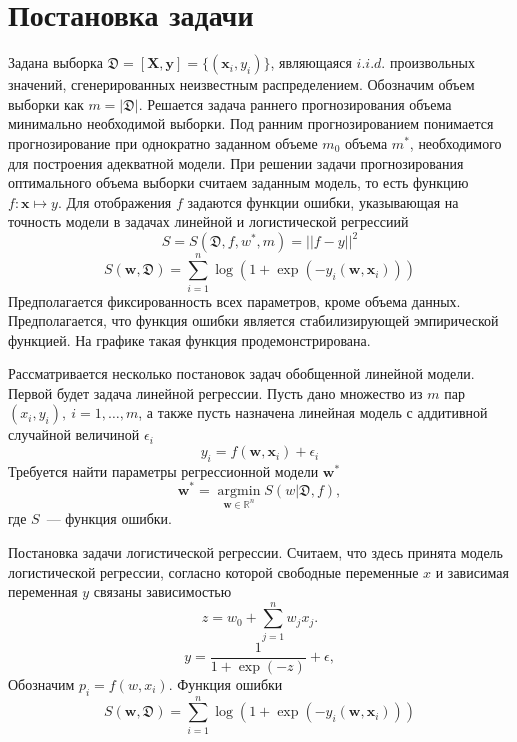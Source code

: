 \documentclass[12pt, twoside]{article}
\newcommand{\mb}[1]{\mathbf{#1}}
\begin{document}
\section{Постановка задачи}
Задана выборка $\mathfrak{D} = [\mathbf{X}, \mb{y}] = \{(\mb{x}_i, y_i)\}$, являющаяся $i.i.d.$ произвольных значений, сгенерированных неизвестным распределением. Обозначим объем выборки как $m = |\mathfrak{D}|$. Решается задача раннего прогнозирования объема минимально необходимой выборки. Под ранним прогнозированием понимается прогнозирование при однократно заданном объеме $m_0$ объема $m^*$, необходимого для построения адекватной модели. При решении задачи прогнозирования оптимального объема выборки считаем заданным модель, то есть функцию $f: \mb{x} \mapsto y$. Для отображения $f$ задаются функции ошибки, указывающая на точность модели в задачах линейной и логистической регрессиий $$S = S(\mathfrak{D}, f, w^*, m) = ||f - y||^2$$ $$S(\textbf{w}, \mathfrak{D}) = \sum_{i=1}^n\log(1 + \exp(-y_i(\textbf{w},\textbf{x}_i)))$$ Предполагается фиксированность всех параметров, кроме объема данных. Предполагается, что функция ошибки является стабилизирующей эмпирической функцией. На графике такая функция продемонстрирована. 
\begin{figure}[!htb]
\end{figure}

Рассматривается несколько постановок задач обобщенной линейной модели. Первой будет задача линейной регрессии. Пусть дано множество из $m$ пар $(x_i, y_i),\ i = 1,\ldots, m$, а также пусть назначена линейная модель с аддитивной случайной величиной $\epsilon_i$ $$y_i = f(\textbf{w}, \textbf{x}_i) + \epsilon_i$$ Требуется найти параметры регрессионной модели $\textbf{w}^*$ $$\textbf{w}^* = \underset{\textbf{w} \in \mathbb{R}^n}{\text{arg} \min}S(w| \mathfrak{D}, f), $$
где $S$~--- функция ошибки.

Постановка задачи логистической регрессии. Считаем, что здесь принята модель логистической регрессии, согласно которой свободные переменные $x$ и зависимая переменная $y$ связаны зависимостью $$z = w_0 + \sum_{j=1}^nw_jx_j.$$ $$y = \frac{1}{1 + \exp(-z)} + \epsilon,$$ Обозначим $p_i = f(w, x_i)$. Функция ошибки $$S(\textbf{w}, \mathfrak{D}) = \sum_{i=1}^n\log(1 + \exp(-y_i(\textbf{w},\textbf{x}_i)))$$
\end{document}
